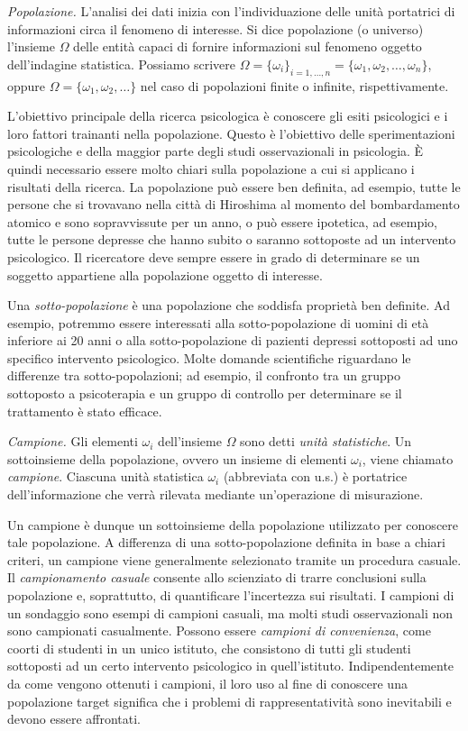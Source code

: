 \documentclass[
]{book}
\theoremstyle{definition}
\theoremstyle{definition}
\theoremstyle{definition}
\theoremstyle{definition}
\theoremstyle{remark}
\begin{document}
\emph{Popolazione.} L'analisi dei dati inizia con l'individuazione delle unità portatrici di informazioni circa il fenomeno di interesse. Si dice popolazione (o universo) l'insieme \(\Omega\) delle entità capaci di fornire informazioni sul fenomeno oggetto dell'indagine statistica. Possiamo scrivere \(\Omega = \{\omega_i\}_{i=1, \dots, n}= \{\omega_1, \omega_2, \dots, \omega_n\}\), oppure \(\Omega = \{\omega_1, \omega_2, \dots \}\) nel caso di popolazioni finite o infinite, rispettivamente.

L'obiettivo principale della ricerca psicologica è conoscere gli esiti psicologici e i loro fattori trainanti nella popolazione. Questo è l'obiettivo delle sperimentazioni psicologiche e della maggior parte degli studi osservazionali in psicologia. È quindi necessario essere molto chiari sulla popolazione a cui si applicano i risultati della ricerca. La popolazione può essere ben definita, ad esempio, tutte le persone che si trovavano nella città di Hiroshima al momento del bombardamento atomico e sono sopravvissute per un anno, o può essere ipotetica, ad esempio, tutte le persone depresse che hanno subito o saranno sottoposte ad un intervento psicologico. Il ricercatore deve sempre essere in grado di determinare se un soggetto appartiene alla popolazione oggetto di interesse.

Una \emph{sotto-popolazione} è una popolazione che soddisfa proprietà ben definite. Ad esempio, potremmo essere interessati alla sotto-popolazione di uomini di età inferiore ai 20 anni o alla sotto-popolazione di pazienti depressi sottoposti ad uno specifico intervento psicologico. Molte domande scientifiche riguardano le differenze tra sotto-popolazioni; ad esempio, il confronto tra un gruppo sottoposto a psicoterapia e un gruppo di controllo per determinare se il trattamento è stato efficace.

\emph{Campione.} Gli elementi \(\omega_i\) dell'insieme \(\Omega\) sono detti \emph{unità statistiche}. Un sottoinsieme della popolazione, ovvero un insieme di elementi \(\omega_i\), viene chiamato \emph{campione}. Ciascuna unità statistica \(\omega_i\) (abbreviata con u.s.) è portatrice dell'informazione che verrà rilevata mediante un'operazione di misurazione.

Un campione è dunque un sottoinsieme della popolazione utilizzato per conoscere tale popolazione. A differenza di una sotto-popolazione definita in base a chiari criteri, un campione viene generalmente selezionato tramite un procedura casuale. Il \emph{campionamento casuale} consente allo scienziato di trarre conclusioni sulla popolazione e, soprattutto, di quantificare l'incertezza sui risultati. I campioni di un sondaggio sono esempi di campioni casuali, ma molti studi osservazionali non sono campionati casualmente. Possono essere \emph{campioni di convenienza}, come coorti di studenti in un unico istituto, che consistono di tutti gli studenti sottoposti ad un certo intervento psicologico in quell'istituto. Indipendentemente da come vengono ottenuti i campioni, il loro uso al fine di conoscere una popolazione target significa che i problemi di rappresentatività sono inevitabili e devono essere affrontati.
\end{document}
